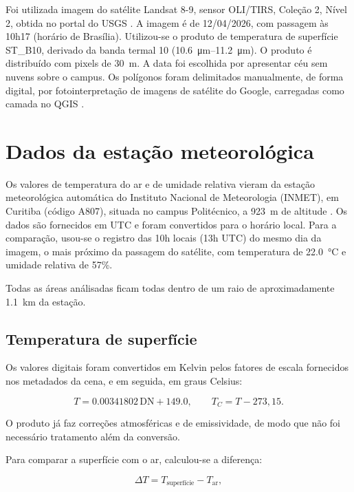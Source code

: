 \documentclass[
12pt,			%
openany,		%
oneside,		%
a4paper,		%
sumario=tradicional,
chapter=TITLE,
section=TITLE,
subsection=Title,
brazil,			%
]{abntex2}
\begin{document}
	Foi utilizada imagem do satélite Landsat 8-9, sensor OLI/TIRS, Coleção 2, Nível 2, obtida no portal do USGS \cite{usgs}. A imagem é de 12/04/2026, com passagem às 10h17 (horário de Brasília). Utilizou-se o produto de temperatura de superfície ST\_B10, derivado da banda termal 10 (\SIrange{10.6}{11.2}{\micro\metre}). O produto é distribuído com pixels de \SI{30}{\metre}. A data foi escolhida por apresentar céu sem nuvens sobre o campus. 
	Os polígonos foram delimitados manualmente, de forma digital, por fotointerpretação de imagens de satélite do Google, carregadas como camada no QGIS \cite{google}.
	
	\section{Dados da estação meteorológica}
	
	Os valores de temperatura do ar e de umidade relativa vieram da estação meteorológica automática do Instituto Nacional de Meteorologia (INMET), em Curitiba (código A807), situada no campus Politécnico, a \SI{923}{\metre} de altitude \cite{inmet2026}. Os dados são fornecidos em UTC e foram convertidos para o horário local. Para a comparação, usou-se o registro das 10h locais (13h UTC) do mesmo dia da imagem, o mais próximo da passagem do satélite, com temperatura de \SI{22.0}{\celsius} e umidade relativa de 57\%.
	
	Todas as áreas análisadas ficam todas dentro de um raio de aproximadamente  \SI{1,1}{\kilo\metre} da estação.
	
	\subsection{Temperatura de superfície}
	
	Os valores digitais foram convertidos em Kelvin pelos fatores de escala fornecidos nos metadados da cena, e em seguida, em graus Celsius: 
	
	\begin{equation}
		T = \num{0.00341802} \, \mathrm{DN} + \num{149.0}, \qquad T_C = T - 273{,}15.
	\end{equation}
	
	O produto já faz correções atmosféricas e de emissividade, de modo que não foi necessário tratamento além da conversão.
	
	Para comparar a superfície com o ar, calculou-se a diferença:
	
		\begin{equation}
		\Delta T = T_{\text{superfície}} - T_{\text{ar}},
	\end{equation}
	
\end{document}
